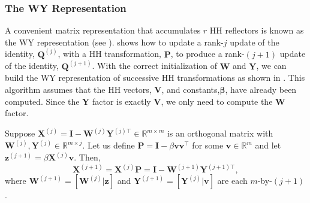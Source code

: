 \documentclass[review,onefignum,onetabnum]{siamart190516}
\newcommand{\R}{\mathbb{R}}
\newcommand{\bb}[1]{\mathbf{#1}}
\begin{document}
\subsubsection{The WY Representation}
A convenient matrix representation that accumulates $r$ HH reflectors is known as the WY representation (see \cite{Bischof1987,golub2013matrix}).
 shows how to update a rank-$j$ update of the identity, $\bb{Q}^{(j)}$, with a HH transformation, $\bb{P}$, to produce a rank-$(j+1)$ update of the identity, $\bb{Q}^{(j+1)}$. 
With the correct initialization of $\bb{W}$ and $\bb{Y}$, we can build the WY representation of successive HH transformations as shown in . 
This algorithm assumes that the HH vectors, $\bb{V}$, and constants,$\bm{\beta}$, have already been computed.
Since the $\bb{Y}$ factor is exactly $\bb{V}$, we only need to compute the $\bb{W}$ factor.
\begin{lemma}\label{lem:WY}
	Suppose $\bb{X}^{(j)}=\bb{I}-\bb{W}^{(j)}\bb{Y}^{(j)\top}\in\R^{m\times m}$ is an orthogonal matrix with $\bb{W}^{(j)},\bb{Y}^{(j)}\in\R^{m\times j}$.
	Let us define $\bb{P}=\bb{I}-\beta\bb{vv}^{\top}$ for some $\bb{v}\in\R^m$ and let $\bb{z}^{(j+1)}=\beta\bb{X}^{(j)}\bb{v}$.
	Then, \[\bb{X}^{(j+1)} = \bb{X}^{(j)}\bb{P} = \bb{I} - \bb{W}^{(j+1)}\bb{Y}^{(j+1)\top}, \]where $ \bb{W}^{(j+1)} =[\bb{W}^{(j)}|\bb{z}]$ and $ \bb{Y}^{(j+1)}=[\bb{Y}^{(j)}|\bb{v}]$ are each $m$-by-$(j+1)$. 
\end{lemma}
%
\end{document}
